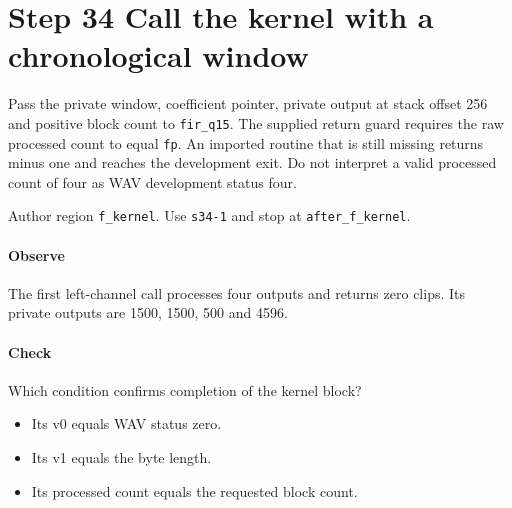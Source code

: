 \section{Step 34 Call the kernel with a chronological window}\label{pcm-wav-s34}
Pass the private window, coefficient pointer, private output at stack offset 256 and positive block count to \texttt{fir\_q15}. The supplied return guard requires the raw processed count to equal \texttt{fp}. An imported routine that is still missing returns minus one and reaches the development exit. Do not interpret a valid processed count of four as WAV development status four.

Author region \texttt{f\_kernel}. Use \texttt{s34-1} and stop at \texttt{after\_f\_kernel}.

\paragraph{Observe} The first left-channel call processes four outputs and returns zero clips. Its private outputs are 1500, 1500, 500 and 4596.

\paragraph{Check} Which condition confirms completion of the kernel block?
\begin{itemize}
  \item[A.] Its v0 equals WAV status zero.
  \item[B.] Its v1 equals the byte length.
  \item[C.] Its processed count equals the requested block count.
\end{itemize}

